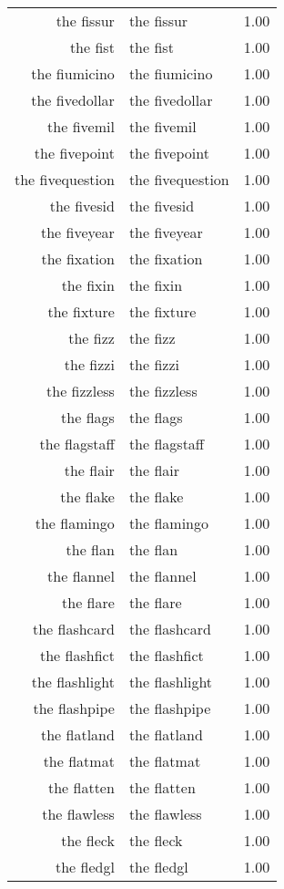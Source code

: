 \begin{table}[ht]
\begin{tabular}{rlr}
  the fissur & the fissur & 1.00 \\ 
  the fist & the fist & 1.00 \\ 
  the fiumicino & the fiumicino & 1.00 \\ 
  the fivedollar & the fivedollar & 1.00 \\ 
  the fivemil & the fivemil & 1.00 \\ 
  the fivepoint & the fivepoint & 1.00 \\ 
  the fivequestion & the fivequestion & 1.00 \\ 
  the fivesid & the fivesid & 1.00 \\ 
  the fiveyear & the fiveyear & 1.00 \\ 
  the fixation & the fixation & 1.00 \\ 
  the fixin & the fixin & 1.00 \\ 
  the fixture & the fixture & 1.00 \\ 
  the fizz & the fizz & 1.00 \\ 
  the fizzi & the fizzi & 1.00 \\ 
  the fizzless & the fizzless & 1.00 \\ 
  the flags & the flags & 1.00 \\ 
  the flagstaff & the flagstaff & 1.00 \\ 
  the flair & the flair & 1.00 \\ 
  the flake & the flake & 1.00 \\ 
  the flamingo & the flamingo & 1.00 \\ 
  the flan & the flan & 1.00 \\ 
  the flannel & the flannel & 1.00 \\ 
  the flare & the flare & 1.00 \\ 
  the flashcard & the flashcard & 1.00 \\ 
  the flashfict & the flashfict & 1.00 \\ 
  the flashlight & the flashlight & 1.00 \\ 
  the flashpipe & the flashpipe & 1.00 \\ 
  the flatland & the flatland & 1.00 \\ 
  the flatmat & the flatmat & 1.00 \\ 
  the flatten & the flatten & 1.00 \\ 
  the flawless & the flawless & 1.00 \\ 
  the fleck & the fleck & 1.00 \\ 
  the fledgl & the fledgl & 1.00 \\ 

\end{tabular}
\end{table}
